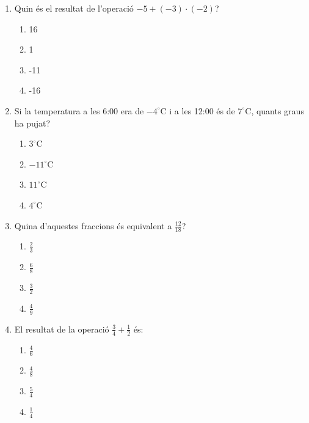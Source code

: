 \documentclass[a4paper, 11pt]{article}
\begin{document}
\begin{enumerate}[label=\textbf{\arabic*.}]
    \item Quin és el resultat de l'operació $-5 + (-3) \cdot (-2)$?
    \begin{multicols}{4}
    \begin{enumerate}[label=\Alph*)]
        \item 16 \item 1 \item -11 \item -16
    \end{enumerate}
    \end{multicols}

    \item Si la temperatura a les 6:00 era de $-4^\circ\text{C}$ i a les 12:00 és de $7^\circ\text{C}$, quants graus ha pujat?
    \begin{multicols}{4}
    \begin{enumerate}[label=\Alph*)]
        \item $3^\circ\text{C}$ \item $-11^\circ\text{C}$ \item $11^\circ\text{C}$ \item $4^\circ\text{C}$
    \end{enumerate}
    \end{multicols}

    \item Quina d'aquestes fraccions és equivalent a $\frac{12}{18}$?
    \begin{multicols}{4}
    \begin{enumerate}[label=\Alph*)]
        \item $\frac{2}{3}$ \item $\frac{6}{8}$ \item $\frac{3}{2}$ \item $\frac{4}{9}$
    \end{enumerate}
    \end{multicols}

    \item El resultat de la operació $\frac{3}{4} + \frac{1}{2}$ és:
    \begin{multicols}{4}
    \begin{enumerate}[label=\Alph*)]
        \item $\frac{4}{6}$ \item $\frac{4}{8}$ \item $\frac{5}{4}$ \item $\frac{1}{4}$
    \end{enumerate}
    \end{multicols}


\end{enumerate}
\end{document}
